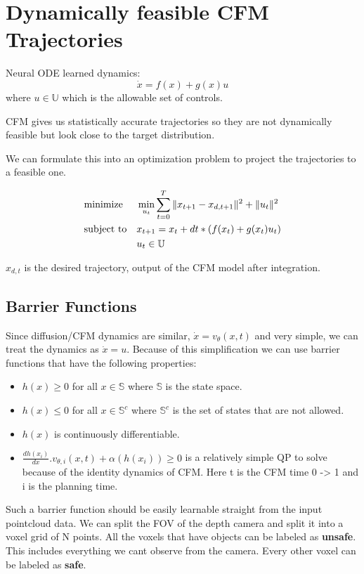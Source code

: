 \documentclass[12pt]{article}
\begin{document}
\section{Dynamically feasible CFM Trajectories}
Neural ODE learned dynamics:\[\dot{x} = f(x) + g(x)u\] where \(u \in \mathbb{U}\) which is the allowable set of controls. 

CFM gives us statistically accurate trajectories so they are not dynamically feasible but look close to the target distribution.

We can formulate this into an optimization problem to project the trajectories to a feasible one.

\[
\begin{aligned}
    &\text{minimize} && \min_{u_{t}} \sum_{t=0}^{T} \|x_{t+1} - x_{d,t+1}\|^2 + \|u_t\|^2 \notag \\
    &\text{subject to} && x_{t+1} = x_{t} + dt * (f(x_{t}) + g(x_{t})u_{t}) \notag \\
    &&& u_{t} \in \mathbb{U} \notag \\
\end{aligned}
\]

\(x_{d,t}\) is the desired trajectory, output of the CFM model after integration.

\subsection{Barrier Functions}
Since diffusion/CFM dynamics are similar, \(\dot{x} = v_{\theta}(x,t)\) and very simple, we can treat the dynamics as \(\dot{x} = u\). Because of this simplification we can use barrier functions that have the following properties:
\begin{itemize}
    \item \(h(x) \geq 0\) for all \(x \in \mathbb{S}\) where \(\mathbb{S}\) is the state space.
    \item \(h(x) \leq 0\) for all \(x \in \mathbb{S}^c\) where \(\mathbb{S}^c\) is the set of states that are not allowed.
    \item \(h(x)\) is continuously differentiable. 
    \item \(\frac{dh(x_{i})}{dx}.v_{\theta,i}(x,t) + \alpha(h(x_{i})) \geq 0\) is a relatively simple QP to solve because of the identity dynamics of CFM. Here t is the CFM time 0 -> 1 and i is the planning time.
\end{itemize}

Such a barrier function should be easily learnable straight from the input pointcloud data. We can split the FOV of the depth camera and split it into a voxel grid of N points. All the voxels that have objects can be labeled as \textbf{unsafe}. This includes everything we cant observe from the camera. 
Every other voxel can be labeled as \textbf{safe}.
\end{document}
